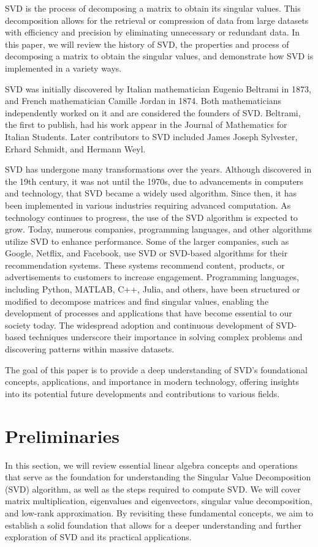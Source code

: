\documentclass[12pt]{article}
\begin{document}
SVD is the process of decomposing a matrix to obtain its singular values. This decomposition allows for the retrieval or compression of data from large datasets with efficiency and precision by eliminating unnecessary or redundant data. In this paper, we will review the history of SVD, the properties and process of decomposing a matrix to obtain the singular values, and demonstrate how SVD is implemented in a variety ways.

SVD was initially discovered by Italian mathematician Eugenio Beltrami in 1873, and French mathematician Camille Jordan in 1874. Both mathematicians independently worked on it and are considered the founders of SVD. Beltrami, the first to publish, had his work appear in the Journal of Mathematics for Italian Students. Later contributors to SVD included James Joseph Sylvester, Erhard Schmidt, and Hermann Weyl.

SVD has undergone many transformations over the years. Although discovered in the 19th century, it was not until the 1970s, due to advancements in computers and technology, that SVD became a widely used algorithm. Since then, it has been implemented in various industries requiring advanced computation. As technology continues to progress, the use of the SVD algorithm is expected to grow. Today, numerous companies, programming languages, and other algorithms utilize SVD to enhance performance. Some of the larger companies, such as Google, Netflix, and Facebook, use SVD or SVD-based algorithms for their recommendation systems. These systems recommend content, products, or advertisements to customers to increase engagement. Programming languages, including Python, MATLAB, C++, Julia, and others, have been structured or modified to decompose matrices and find singular values, enabling the development of processes and applications that have become essential to our society today. The widespread adoption and continuous development of SVD-based techniques underscore their importance in solving complex problems and discovering patterns within massive datasets.

The goal of this paper is to provide a deep understanding of SVD's foundational concepts, applications, and importance in modern technology, offering insights into its potential future developments and contributions to various fields.

\section{Preliminaries}
In this section, we will review essential linear algebra concepts and operations that serve as the foundation for understanding the Singular Value Decomposition (SVD) algorithm, as well as the steps required to compute SVD. We will cover matrix multiplication, eigenvalues and eigenvectors, singular value decomposition, and low-rank approximation. By revisiting these fundamental concepts, we aim to establish a solid foundation that allows for a deeper understanding and further exploration of SVD and its practical applications.
\end{document}
